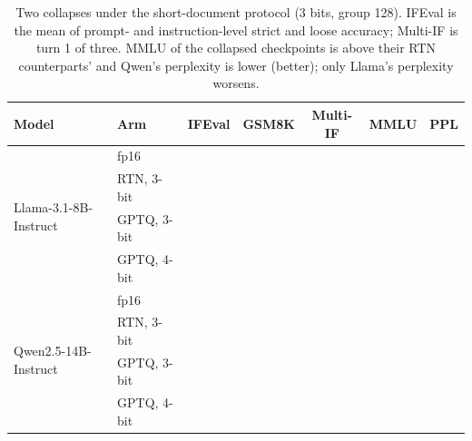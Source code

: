 \begin{table}[t]
\caption{Two collapses under the short-document protocol (3 bits, group 128). IFEval is the mean of prompt- and instruction-level strict and loose accuracy; Multi-IF is turn 1 of three. MMLU of the collapsed checkpoints is above their RTN counterparts' and Qwen's perplexity is lower (better); only Llama's perplexity worsens.}
\label{tab:collapse}
\begin{center}
\small
\begin{tabular}{llccccc}
\toprule
Model & Arm & IFEval & GSM8K & Multi-IF & MMLU & PPL \\
\midrule
\multirow{4}{*}{Llama-3.1-8B-Instruct}
 & fp16        & \LfpIF{}       & \LfpGSM{}       & \LfpMIFone{}       & \LfpMMLU{}       & \LfpPPL{} \\
 & RTN, 3-bit  & \LrtnIF{}      & \LrtnGSM{}      & \LrtnMIFone{}      & \LrtnMMLU{}      & \LrtnPPL{} \\
 & GPTQ, 3-bit & \LgptqIF{}     & \LgptqGSM{}     & \LgptqMIFone{}     & \LgptqMMLU{}     & \LgptqPPL{} \\
 & GPTQ, 4-bit & \LgptqFourIF{} & \LgptqFourGSM{} & \LgptqFourMIFone{} & \LgptqFourMMLU{} & \LgptqFourPPL{} \\
\midrule
\multirow{4}{*}{Qwen2.5-14B-Instruct}
 & fp16        & \QfpIF{}       & \QfpGSM{}       & \QfpMIFone{}       & \QfpMMLU{}       & \QfpPPL{} \\
 & RTN, 3-bit  & \QrtnIF{}      & \QrtnGSM{}      & \QrtnMIFone{}      & \QrtnMMLU{}      & \QrtnPPL{} \\
 & GPTQ, 3-bit & \QgptqIF{}     & \QgptqGSM{}     & \QgptqMIFone{}     & \QgptqMMLU{}     & \QgptqPPL{} \\
 & GPTQ, 4-bit & \QgptqFourIF{} & \QgptqFourGSM{} & \QgptqFourMIFone{} & \QgptqFourMMLU{} & \QgptqFourPPL{} \\
\bottomrule
\end{tabular}
\end{center}
\end{table}
